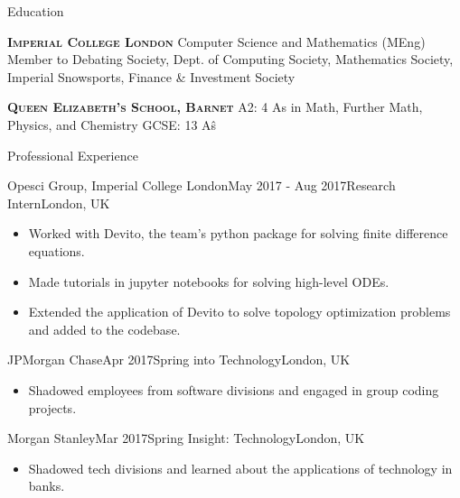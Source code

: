 \documentclass[10pt,a4paper]{article}
\begin{document}
\begin{section}{Education}

\textsc{\textbf{Imperial College London}}
Computer Science and Mathematics (MEng)
Member to Debating Society, Dept. of Computing Society, Mathematics Society, 
Imperial Snowsports, Finance \& Investment Society

\textsc{\textbf{Queen Elizabeth's School, Barnet}}
A2: 4 A\*s in Math, Further Math, Physics, and Chemistry
GCSE: 13 A\^s


\begin{section}{Professional Experience}

    \begin{rSubsection}{Opesci Group, Imperial College London}{May 2017 - Aug 2017}{Research Intern}{London, UK}
\begin{itemize}
    \item Worked with Devito, the team's python package for solving finite difference equations.
    \item Made tutorials in jupyter notebooks for solving high-level ODEs.
    \item Extended the application of Devito to solve topology optimization problems and added to the codebase.
\end{itemize}


\begin{rSubsection}{JPMorgan Chase}{Apr 2017}{Spring into Technology}{London, UK}
\begin{itemize}
    \item Shadowed employees from software divisions and engaged in group coding projects.
\end{itemize}


\begin{rSubsection}{Morgan Stanley}{Mar 2017}{Spring Insight: Technology}{London, UK}
\begin{itemize}
    \item Shadowed tech divisions and learned about the applications of technology in banks.
\end{itemize}


\end{rSubsection}
\end{rSubsection}
\end{rSubsection}
\end{section}
\end{section}
\end{document}
